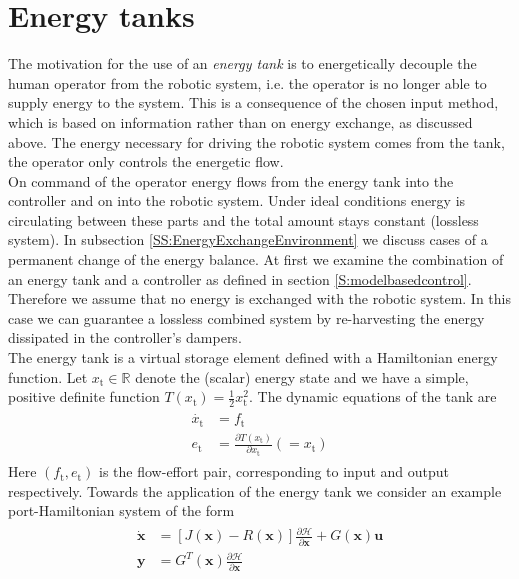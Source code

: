 \documentclass[a4paper,twoside, openright,12pt]{report}
\newcommand{\f}[1]{\boldsymbol{#1}}
\newcommand{\g}[1]{\text{#1}}
\begin{document}
{\section{Energy tanks}\label{S:EnergyTanks}
The motivation for the use of an \emph{energy tank} is to energetically decouple the human operator from the robotic system, i.e. the operator is no longer able to supply energy to the system. This is a consequence of the chosen input method, which is based on information rather than on energy exchange, as discussed above. The energy necessary for driving the robotic system comes from the tank, the operator only controls the energetic flow.\\
On command of the operator energy flows from the energy tank into the controller and on into the robotic system. Under ideal conditions energy is circulating between these parts and the total amount stays constant (lossless system). In subsection \ref{SS:EnergyExchangeEnvironment} we discuss cases of a permanent change of the energy balance. At first we examine the combination of an energy tank and a controller as defined in section \ref{S:modelbasedcontrol}. Therefore we assume that no energy is exchanged with the robotic system. In this case we can guarantee a lossless combined system by re-harvesting the energy dissipated in the controller's dampers. \\ 
The energy tank is a virtual storage element defined with a Hamiltonian energy function. Let $x_\g{t} \in \mathbb{R}$ denote the (scalar) energy state and we have a simple, positive definite function $T(x_\g{t}) = \frac{1}{2}x_\g{t}^2$. The dynamic equations of the tank are
\begin{eqnarray}
\begin{aligned}
\dot{x_\g{t}} &= f_\g{t} \\
e_\g{t} &= \frac{\partial T(x_\g{t})}{\partial x_\g{t}} (=x_\g{t})
\end{aligned}
\end{eqnarray}
Here $(f_\g{t},e_\g{t})$ is the flow-effort pair, corresponding to input and output respectively. Towards the application of the energy tank we consider an example port-Hamiltonian system of the form
\begin{eqnarray}
\begin{aligned}
\dot{\f{x}} &= [J(\f{x}) - R(\f{x})] \frac{\partial \mathcal{H}}{\partial \f{x}} + G(\f{x})\f{u} \\
\f{y} &= G^T(\f{x}) \frac{\partial \mathcal{H}}{\partial \f{x}}
\end{aligned}

\end{eqnarray}}
\end{document}
